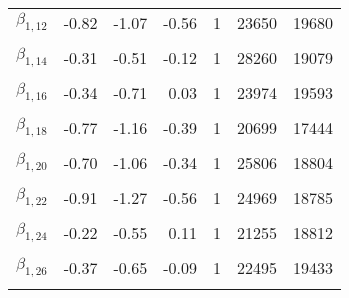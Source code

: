 \begin{longtable}[t]{lrrrrrr}
$\beta_{1, 12}$ & -0.82 & -1.07 & -0.56 & 1 & 23650 & 19680\\
\cellcolor{gray!6}{$\beta_{1, 13}$} & \cellcolor{gray!6}{-0.51} & \cellcolor{gray!6}{-0.90} & \cellcolor{gray!6}{-0.12} & \cellcolor{gray!6}{1} & \cellcolor{gray!6}{25219} & \cellcolor{gray!6}{19171}\\
$\beta_{1, 14}$ & -0.31 & -0.51 & -0.12 & 1 & 28260 & 19079\\
\cellcolor{gray!6}{$\beta_{1, 15}$} & \cellcolor{gray!6}{-0.73} & \cellcolor{gray!6}{-1.04} & \cellcolor{gray!6}{-0.42} & \cellcolor{gray!6}{1} & \cellcolor{gray!6}{25070} & \cellcolor{gray!6}{19395}\\
$\beta_{1, 16}$ & -0.34 & -0.71 & 0.03 & 1 & 23974 & 19593\\
\cellcolor{gray!6}{$\beta_{1, 17}$} & \cellcolor{gray!6}{-0.68} & \cellcolor{gray!6}{-1.00} & \cellcolor{gray!6}{-0.36} & \cellcolor{gray!6}{1} & \cellcolor{gray!6}{25015} & \cellcolor{gray!6}{19397}\\
$\beta_{1, 18}$ & -0.77 & -1.16 & -0.39 & 1 & 20699 & 17444\\
\cellcolor{gray!6}{$\beta_{1, 19}$} & \cellcolor{gray!6}{-0.12} & \cellcolor{gray!6}{-0.34} & \cellcolor{gray!6}{0.09} & \cellcolor{gray!6}{1} & \cellcolor{gray!6}{22533} & \cellcolor{gray!6}{18234}\\
$\beta_{1, 20}$ & -0.70 & -1.06 & -0.34 & 1 & 25806 & 18804\\
\cellcolor{gray!6}{$\beta_{1, 21}$} & \cellcolor{gray!6}{-0.86} & \cellcolor{gray!6}{-1.17} & \cellcolor{gray!6}{-0.55} & \cellcolor{gray!6}{1} & \cellcolor{gray!6}{22289} & \cellcolor{gray!6}{19219}\\
$\beta_{1, 22}$ & -0.91 & -1.27 & -0.56 & 1 & 24969 & 18785\\
\cellcolor{gray!6}{$\beta_{1, 23}$} & \cellcolor{gray!6}{-0.69} & \cellcolor{gray!6}{-1.00} & \cellcolor{gray!6}{-0.37} & \cellcolor{gray!6}{1} & \cellcolor{gray!6}{28003} & \cellcolor{gray!6}{20604}\\
$\beta_{1, 24}$ & -0.22 & -0.55 & 0.11 & 1 & 21255 & 18812\\
\cellcolor{gray!6}{$\beta_{1, 25}$} & \cellcolor{gray!6}{-0.66} & \cellcolor{gray!6}{-0.95} & \cellcolor{gray!6}{-0.38} & \cellcolor{gray!6}{1} & \cellcolor{gray!6}{30061} & \cellcolor{gray!6}{19000}\\
$\beta_{1, 26}$ & -0.37 & -0.65 & -0.09 & 1 & 22495 & 19433\\
\cellcolor{gray!6}{$\beta_{1, 27}$} & \cellcolor{gray!6}{-0.75} & \cellcolor{gray!6}{-1.07} & \cellcolor{gray!6}{-0.43} & \cellcolor{gray!6}{1} & \cellcolor{gray!6}{24383} & \cellcolor{gray!6}{19407}\\

\end{longtable}
